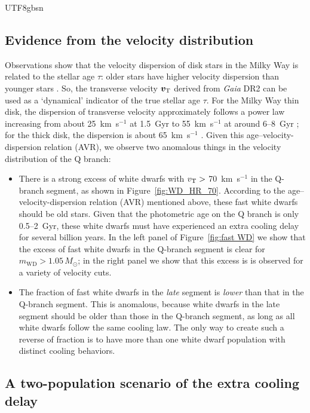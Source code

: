 \documentclass[twocolumn, times, trackchanges]{aastex63_bren}
\newcommand{\mathbfit}{\bm}
\newcommand{\bvT}{\mathbfit{v}_{\rm T}}
\begin{document}
\begin{CJK*}{UTF8}{gbsn}
\subsection{Evidence from the velocity distribution}
\label{sec:velocity distribution} 

Observations show that the velocity dispersion of disk stars in the Milky Way is related to the stellar age $\tau$: older stars have higher velocity dispersion than younger stars \citep[e.g.,][]{Holmberg_2009}. So, the transverse velocity $\bvT$ derived from {\it Gaia} DR2 can be used as a `dynamical' indicator of the true stellar age $\tau$. For the Milky Way thin disk, the dispersion of transverse velocity approximately follows a power law increasing from about 25~km~s$^{-1}$ at 1.5~Gyr to 55~km~s$^{-1}$ at around 6--8~Gyr \citep[e.g.,][]{Holmberg_2009}; for the thick disk, the dispersion is about 65~km~s$^{-1}$ \citep[e.g.,][]{Sharma_2014}. Given this age--velocity-dispersion relation (AVR), we observe two anomalous things in the velocity distribution of the Q branch:
\begin{itemize}
    \item There is a strong excess of white dwarfs with $v_{\rm T}>$ 70~km~s$^{-1}$ in the Q-branch segment, as shown in Figure~\ref{fig:WD_HR_70}. According to the age--velocity-dispersion relation (AVR) mentioned above, these fast white dwarfs should be old stars. Given that the photometric age on the Q branch is only 0.5--2~Gyr, these white dwarfs must have experienced an extra cooling delay for several billion years. In the left panel of Figure~\ref{fig:fast WD} we show that the excess of fast white dwarfs in the Q-branch segment is clear for $m_\text{WD}>1.05\,M_\odot$; in the right panel we show that this excess is is observed for a variety of velocity cuts.
    \item The fraction of fast white dwarfs in the \emph{late} segment is \emph{lower} than that in the Q-branch segment. This is anomalous, because white dwarfs in the late segment should be older than those in the Q-branch segment, as long as all white dwarfs follow the same cooling law. The only way to create such a reverse of fraction is to have more than one white dwarf population with distinct cooling behaviors.
\end{itemize}


\subsection{A two-population scenario of the extra cooling delay}
\label{sec:two parameter description}


\end{CJK*}
\end{document}
